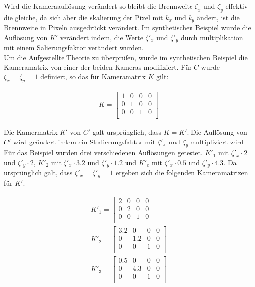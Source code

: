 Wird die Kameraauflösung verändert so bleibt die Brennweite $\zeta_x$ und $\zeta_y$ effektiv die gleiche, da sich aber die skalierung der Pixel mit $k_x$ und $k_y$ ändert, ist die Brennweite in Pixeln ausgedrückt verändert. Im synthetischen Beispiel wurde die Auflösung von $K'$ verändert indem, die Werte $\zeta'_x$ und $\zeta'_y$ durch multiplikation mit einem Salierungsfaktor verändert wurden.\\

Um die Aufgestellte Theorie zu überprüfen, wurde im synthetischen Beispiel die Kameramatrix von einer der beiden Kameras modifiziert. Für $C$ wurde $\zeta_x = \zeta_y = 1$ definiert, so das für Kameramatrix $K$ gilt:

\begin{gather}
	K = \begin{bmatrix}
		1&0&0&0\\
		0&1&0&0\\
		0&0&1&0\\
	\end{bmatrix}
\end{gather}


Die Kamermatrix $K'$ von $C'$ galt ursprünglich, dass $K = K'$. Die Auflösung von $C'$ wird geändert indem ein Skalierungsfaktor mit $\zeta'_x$ und $\zeta_y$ multipliziert wird. Für das Beispiel wurden drei verschiedenen Auflösungen getestet.  $K'_1$ mit $\zeta'_x \cdot 2$ und $\zeta'_y \cdot 2$, $K'_2$ mit $\zeta'_x \cdot 3.2$ und $\zeta'_y \cdot 1.2$ und $K'_e$ mit $\zeta'_x \cdot 0.5$ und $\zeta'_y \cdot 4.3$. Da ursprünglich galt, dass $\zeta'_x =\zeta'_y = 1$ ergeben sich die folgenden Kameramatrizen für $K'$.



\begin{gather}
	K'_1 = \begin{bmatrix}
		2&0&0&0\\
		0&2&0&0\\
		0&0&1&0\\
	\end{bmatrix}\\
	K'_2 = \begin{bmatrix}
		3.2&0&0&0\\
		0&1.2&0&0\\
		0&0&1&0\\
	\end{bmatrix}\\
	K'_3 = \begin{bmatrix}
		0.5&0&0&0\\
		0&4.3&0&0\\
		0&0&1&0\\
	\end{bmatrix}
\end{gather}\\

